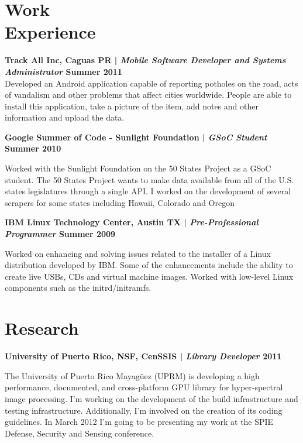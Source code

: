 \documentclass[margin,line]{res}
\begin{document}
\begin{resume}
\section{\sc Work \\Experience}

{\bf Track All Inc, Caguas PR | {\em Mobile Software Developer and Systems Administrator} \hfill {\bf Summer 2011 \\} }
\vspace{-.01cm}
Developed an Android application capable of reporting potholes on the road, acts of vandalism and other problems that affect cities worldwide. People are able to install this application, take a picture of the item, add notes and other information and upload the data.

{\bf Google Summer of Code - Sunlight Foundation | {\em GSoC Student} \hfill {\bf Summer 2010 \\} }
\vspace{-.01cm}

Worked with the Sunlight Foundation on the 50 States Project as a GSoC student. The 50 States Project wants to make data available from all of the U.S. states legislatures through a single API. I worked on the development of several scrapers for some states including Hawaii, Colorado and Oregon 

{\bf IBM Linux Technology Center, Austin TX | {\em Pre-Professional Programmer} \hfill {\bf Summer 2009 \\} }
\vspace{-.01cm}

Worked on enhancing and solving issues related to the installer of a Linux distribution developed by IBM. Some of the enhancements include the ability to create live USBs, CDs and virtual machine images. Worked with low-level Linux components such as the initrd/initramfs. 

\section{\sc Research}

{\bf University of Puerto Rico, NSF, CenSSIS  | {\em Library Developer} \hfill {\bf 2011 \\} }
\vspace{-.01cm}

The University of Puerto Rico Mayagüez (UPRM) is developing a high performance, documented, and cross-platform GPU library for hyper-spectral image processing. I'm working on the development of the build infrastructure and testing infrastructure. Additionally, I'm involved on the creation of its coding guidelines. In March 2012 I'm going to be presenting my work at the SPIE Defense, Security and Sensing conference. 


\end{resume}
\end{document}
